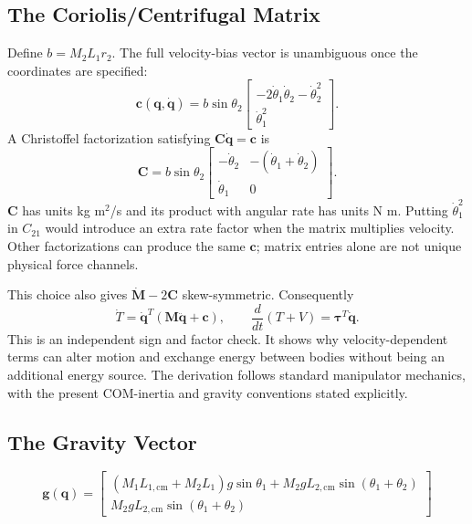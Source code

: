 \subsection*{The Coriolis/Centrifugal Matrix}
Define $b=M_2L_1r_2$. The full velocity-bias vector is unambiguous once the coordinates are specified:
\[
\bm c(\bm q,\dot{\bm q})=
b\sin\theta_2\begin{bmatrix}-2\dot\theta_1\dot\theta_2-\dot\theta_2^2\\\dot\theta_1^2\end{bmatrix}.
\]
A Christoffel factorization satisfying $\bm C\dot{\bm q}=\bm c$ is
\begin{equation}
\bm C=b\sin\theta_2
\begin{bmatrix}
-\dot\theta_2&-(\dot\theta_1+\dot\theta_2)\\
\dot\theta_1&0
\end{bmatrix}.
\label{eq:ch03_coriolis_matrix}
\end{equation}
$\bm C$ has units kg m$^2$/s and its product with angular rate has units N m. Putting $\dot\theta_1^2$ in $C_{21}$ would introduce an extra rate factor when the matrix multiplies velocity. Other factorizations can produce the same $\bm c$; matrix entries alone are not unique physical force channels.

This choice also gives $\dot{\bm M}-2\bm C$ skew-symmetric. Consequently
\[
\dot T=\dot{\bm q}^{T}(\bm M\ddot{\bm q}+\bm c),\qquad
\frac{d}{dt}(T+V)=\bm\tau^T\dot{\bm q}.
\]
This is an independent sign and factor check. It shows why velocity-dependent terms can alter motion and exchange energy between bodies without being an additional energy source. The derivation follows standard manipulator mechanics, with the present COM-inertia and gravity conventions stated explicitly. \citep{TedrakeMultibodyEnergy}

\subsection*{The Gravity Vector}

\begin{equation}
\bm{g}(\bm{q}) = \begin{bmatrix}
(M_1 L_{1,\text{cm}} + M_2 L_1) g \sin \theta_1 + M_2 g L_{2,\text{cm}} \sin(\theta_1 + \theta_2) \\
M_2 g L_{2,\text{cm}} \sin(\theta_1 + \theta_2)
\end{bmatrix}
\label{eq:ch03_gravity_vector}
\end{equation}



